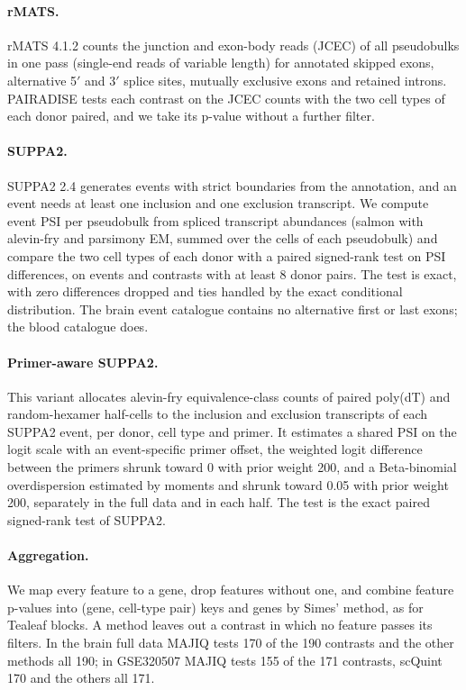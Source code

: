 \documentclass[11pt]{article}
\begin{document}
\paragraph{rMATS.} rMATS 4.1.2 \cite{shen2014} counts the junction and exon-body reads (JCEC) of all pseudobulks in one pass (single-end reads of variable length) for annotated skipped exons, alternative 5$'$ and 3$'$ splice sites, mutually exclusive exons and retained introns. PAIRADISE \cite{demirdjian2020} tests each contrast on the JCEC counts with the two cell types of each donor paired, and we take its p-value without a further filter.

\paragraph{SUPPA2.} SUPPA2 2.4 \cite{trincado2018} generates events with strict boundaries from the annotation, and an event needs at least one inclusion and one exclusion transcript. We compute event PSI per pseudobulk from spliced transcript abundances (salmon with alevin-fry and parsimony EM, summed over the cells of each pseudobulk) and compare the two cell types of each donor with a paired signed-rank test on PSI differences, on events and contrasts with at least 8 donor pairs. The test is exact, with zero differences dropped and ties handled by the exact conditional distribution. The brain event catalogue contains no alternative first or last exons; the blood catalogue does.

\paragraph{Primer-aware SUPPA2.} This variant allocates alevin-fry equivalence-class counts of paired poly(dT) and random-hexamer half-cells to the inclusion and exclusion transcripts of each SUPPA2 event, per donor, cell type and primer. It estimates a shared PSI on the logit scale with an event-specific primer offset, the weighted logit difference between the primers shrunk toward 0 with prior weight 200, and a Beta-binomial overdispersion estimated by moments and shrunk toward 0.05 with prior weight 200, separately in the full data and in each half. The test is the exact paired signed-rank test of SUPPA2.

\paragraph{Aggregation.} We map every feature to a gene, drop features without one, and combine feature p-values into (gene, cell-type pair) keys and genes by Simes' method, as for Tealeaf blocks. A method leaves out a contrast in which no feature passes its filters. In the brain full data MAJIQ tests 170 of the 190 contrasts and the other methods all 190; in GSE320507 MAJIQ tests 155 of the 171 contrasts, scQuint 170 and the others all 171.
\end{document}
